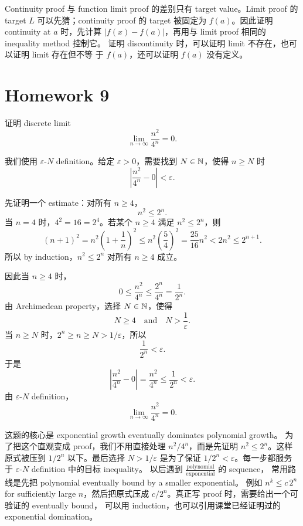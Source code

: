 Continuity proof 与 function limit proof 的差别只有 target value。Limit
proof 的 target \(L\) 可以先猜；continuity proof 的 target 被固定为
\(f(a)\)。因此证明 continuity at \(a\) 时，先计算
\(|f(x)-f(a)|\)，再用与 limit proof 相同的 inequality method 控制它。
证明 discontinuity 时，可以证明 limit 不存在，也可以证明 limit 存在但不等
于 \(f(a)\)，还可以证明 \(f(a)\) 没有定义。

\section{Homework 9}

\begin{exerciseblock}
证明 discrete limit
\[
  \lim_{n\to\infty}\frac{n^2}{4^n}=0.
\]
\end{exerciseblock}

\begin{solution}
我们使用 \(\varepsilon\)-\(N\) definition。给定 \(\varepsilon>0\)，需要找到
\(N\in\mathbb{N}\)，使得 \(n\geq N\) 时
\[
  \left|\frac{n^2}{4^n}-0\right|<\varepsilon.
\]

先证明一个 estimate：对所有 \(n\geq4\)，
\[
  n^2\leq2^n.
\]
当 \(n=4\) 时，\(4^2=16=2^4\)。若某个 \(n\geq4\) 满足
\(n^2\leq2^n\)，则
\[
  (n+1)^2
  =
  n^2\left(1+\frac1n\right)^2
  \leq
  n^2\left(\frac54\right)^2
  =
  \frac{25}{16}n^2
  <
  2n^2
  \leq
  2^{n+1}.
\]
所以 by induction，\(n^2\leq2^n\) 对所有 \(n\geq4\) 成立。

因此当 \(n\geq4\) 时，
\[
  0\leq\frac{n^2}{4^n}
  \leq
  \frac{2^n}{4^n}
  =
  \frac{1}{2^n}.
\]
由 Archimedean property，选择 \(N\in\mathbb{N}\)，使得
\[
  N\geq4
  \quad\text{and}\quad
  N>\frac1\varepsilon.
\]
当 \(n\geq N\) 时，\(2^n\geq n\geq N>1/\varepsilon\)，所以
\[
  \frac1{2^n}<\varepsilon.
\]
于是
\[
  \left|\frac{n^2}{4^n}-0\right|
  =
  \frac{n^2}{4^n}
  \leq
  \frac1{2^n}
  <
  \varepsilon.
\]
由 \(\varepsilon\)-\(N\) definition，
\[
  \lim_{n\to\infty}\frac{n^2}{4^n}=0.
\]
\end{solution}

\begin{explanation}
这题的核心是 exponential growth eventually dominates polynomial growth。
为了把这个直观变成 proof，我们不用直接处理 \(n^2/4^n\)，而是先证明
\(n^2\leq2^n\)。这样原式被压到 \(1/2^n\) 以下。最后选择 \(N>1/\varepsilon\)
是为了保证 \(1/2^n<\varepsilon\)。每一步都服务于
\(\varepsilon\)-\(N\) definition 中的目标 inequality。
以后遇到 \(\frac{\text{polynomial}}{\text{exponential}}\) 的 sequence，
常用路线是先把 polynomial eventually bound by a smaller exponential。
例如 \(n^k\leq c\,2^n\) for sufficiently large \(n\)，然后把原式压成
\(c/2^n\)。真正写 proof 时，需要给出一个可验证的 eventually bound，
可以用 induction，也可以引用课堂已经证明过的 exponential domination。
\end{explanation}

